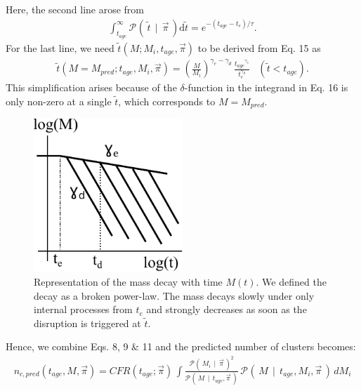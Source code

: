 \documentclass[a4paper]{article}
\newcommand{\given}{\ensuremath{\,\mid\,}}
\newcommand{\proba}[2][]{\ensuremath{\mathcal{P}_{#1}\left(\, #2 \,\right)}}
\newcommand{\nclpred}{\ensuremath{n_{c,pred}}}
\newcommand{\tage}{\ensuremath{t_{age}}}
\newcommand{\Mi}{\ensuremath{M_{i}}}
\newcommand{\ts}{\ensuremath{\tilde{t}}} %
\newcommand{\PI}{\ensuremath{\overrightarrow{\pi}}} %
\newcommand{\dif}{\ensuremath{\text{d}}} %
\begin{document}
 Here, the second line arose from 
\begin{eqnarray}
\int_{\tage}^{\infty}\proba{\ts\given\PI}\dif\ts = 
e^{-(\tage-t_e)/\tau}.
\end{eqnarray}
For the last line, we need $\ts(M;\Mi,\tage,\PI)$ to be derived from Eq. 15 as
\begin{eqnarray}
\ts \left(M=M_{pred}; \tage, \Mi, \PI \right) = 
\left( \frac{M}{\Mi} \right)^{\gamma_e - \gamma_d} \, \frac{\tage^{\gamma_e}}{t_{e}^{\gamma_d}} & \left (\ts < \tage\right ).
\end{eqnarray}
This simplification arises because of the $\delta$-function in the integrand in Eq. 16 is only non-zero at a single $\ts$, which corresponds to $M=M_{pred}$.

\begin{figure}
  \begin{center}
    \includegraphics[width=0.5\textwidth]{schema.pdf}
  \end{center}
  \caption{Representation of the mass decay with time $M(t)$. We defined the decay as a broken power-law. The mass decays slowly under only internal processes from $t_e$ and strongly decreases as soon as the disruption is triggered at $\ts$.
  }
  \label{fig:mass_evol}
\end{figure}





Hence, we combine Eqs. 8, 9 \& 11 and the predicted number of clusters becomes:
\begin{eqnarray}
\nclpred(\tage, M, \PI) = CFR(\tage; \PI)\,\int \frac{\proba{\Mi\given\PI}^2}{\proba{M\given \tage,\PI}} \,\proba{M \given \tage, \Mi, \PI}\, d\Mi
\end{eqnarray}
\end{document}
